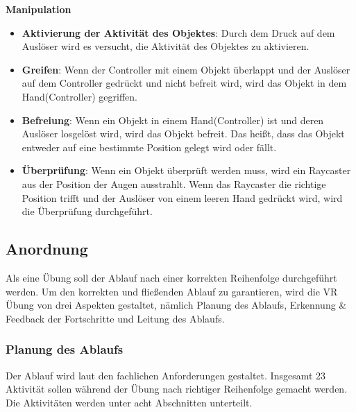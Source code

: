   \textbf{Manipulation}
  \begin{itemize}
  \item \textbf{Aktivierung der Aktivität des Objektes}: Durch dem Druck auf dem Auslöser wird es versucht, die Aktivität des Objektes zu aktivieren.
  \item \textbf{Greifen}: Wenn der Controller mit einem Objekt überlappt und der Auslöser auf dem Controller gedrückt und nicht befreit wird, wird das Objekt in dem Hand(Controller) gegriffen.
  \item \textbf{Befreiung}: Wenn ein Objekt in einem Hand(Controller) ist und deren Auslöser losgelöst wird, wird das Objekt befreit. Das heißt, dass das Objekt entweder auf eine bestimmte Position gelegt wird oder fällt.
  \item \textbf{Überprüfung}: Wenn ein Objekt überprüft werden muss, wird ein Raycaster aus der Position der Augen ausstrahlt. Wenn das Raycaster die richtige Position trifft und der Auslöser von einem leeren Hand gedrückt wird, wird die Überprüfung durchgeführt.
  \end{itemize}
  
 \subsection{Anordnung}
 Als eine Übung soll der Ablauf nach einer korrekten Reihenfolge durchgeführt werden. Um den korrekten und fließenden Ablauf zu garantieren, wird die VR Übung von drei Aspekten gestaltet, nämlich Planung des Ablaufs, Erkennung \& Feedback der Fortschritte und Leitung des Ablaufs.
  \subsubsection{Planung des Ablaufs}
      
  Der Ablauf wird laut den fachlichen Anforderungen gestaltet. Insgesamt 23 Aktivität sollen während der Übung nach richtiger Reihenfolge gemacht werden. Die Aktivitäten werden unter acht Abschnitten unterteilt.
  
